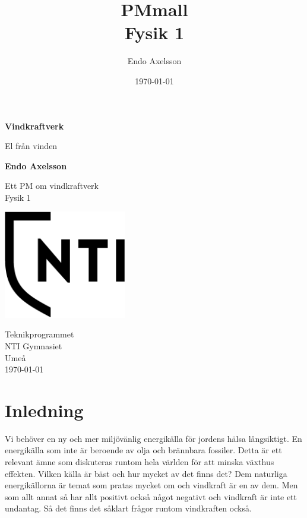 \documentclass[11p]{article}
\title{PMmall \\ \small Fysik 1}
\author{Endo Axelsson}
\date{\today}
\begin{document}
    \begin{titlepage}
        \begin{center}
            \vspace*{1cm}

            \Huge
            \textbf{Vindkraftverk}

            \vspace{0.5cm}
            \LARGE
            El från vinden

            \vspace{1.5cm}

            \textbf{Endo Axelsson}

            \vfill

            Ett PM om vindkraftverk\\
            Fysik 1

            \vspace{0.8cm}

            \includegraphics[width=0.4\textwidth]{../images/NTI Gymnasiet_Symbol_print_svart.png}

            \Large
            Teknikprogrammet\\
            NTI Gymnasiet\\
            Umeå\\
            \today

        \end{center}
    \end{titlepage}
    \tableofcontents
    \newpage

    \section{Inledning}
    Vi behöver en ny och mer miljövänlig energikälla för jordens hälsa långsiktigt.
    En energikälla som inte är  beroende av olja och brännbara fossiler.
    Detta är ett relevant ämne som diskuteras runtom hela världen för att minska växthus effekten.
    Vilken källa är bäst och hur mycket av det finns det?
    Dem naturliga energikällorna är temat som pratas mycket om och vindkraft är en av dem.
    Men som allt annat så har allt positivt också något negativt och vindkraft är inte ett undantag.
    Så det finns det såklart frågor runtom vindkraften också.
\end{document}
